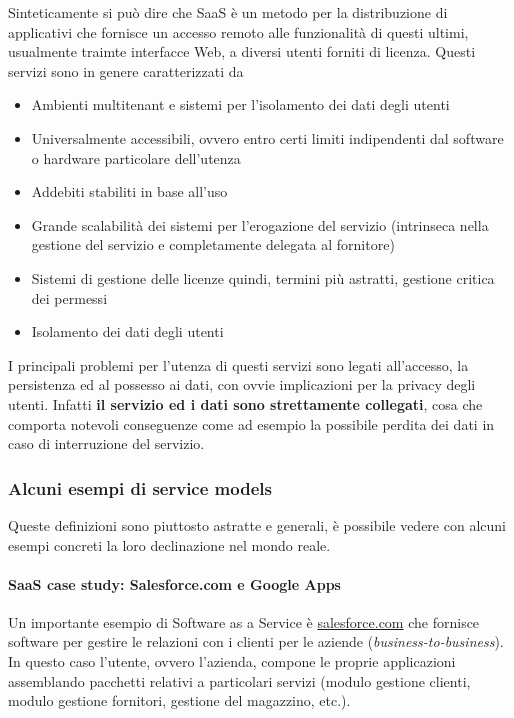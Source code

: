 \documentclass[italian,]{article}
\providecommand{\tightlist}{%
  \setlength{\itemsep}{0pt}\setlength{\parskip}{0pt}}
\let\oldparagraph\paragraph
\renewcommand{\paragraph}[1]{\oldparagraph{#1}\mbox{}}
\begin{document}
Sinteticamente si può dire che SaaS è un metodo per la distribuzione di
applicativi che fornisce un accesso remoto alle funzionalità di questi
ultimi, usualmente traimte interfacce Web, a diversi utenti forniti di
licenza. Questi servizi sono in genere caratterizzati da

\begin{itemize}
\tightlist
\item
  Ambienti multitenant e sistemi per l'isolamento dei dati degli utenti
\item
  Universalmente accessibili, ovvero entro certi limiti indipendenti dal
  software o hardware particolare dell'utenza
\item
  Addebiti stabiliti in base all'uso
\item
  Grande scalabilità dei sistemi per l'erogazione del servizio
  (intrinseca nella gestione del servizio e completamente delegata al
  fornitore)
\item
  Sistemi di gestione delle licenze quindi, termini più astratti,
  gestione critica dei permessi
\item
  Isolamento dei dati degli utenti
\end{itemize}

I principali problemi per l'utenza di questi servizi sono legati
all'accesso, la persistenza ed al possesso ai dati, con ovvie
implicazioni per la privacy degli utenti. Infatti \textbf{il servizio ed
i dati sono strettamente collegati}, cosa che comporta notevoli
conseguenze come ad esempio la possibile perdita dei dati in caso di
interruzione del servizio.

\subsubsection{Alcuni esempi di service
models}\label{alcuni-esempi-di-service-models}

Queste definizioni sono piuttosto astratte e generali, è possibile
vedere con alcuni esempi concreti la loro declinazione nel mondo reale.

\paragraph{SaaS case study: Salesforce.com e Google
Apps}\label{saas-case-study-salesforce.com-e-google-apps}

Un importante esempio di Software as a Service è
\href{www.salesforce.com}{salesforce.com} che fornisce software per
gestire le relazioni con i clienti per le aziende
(\emph{business-to-business}). In questo caso l'utente, ovvero
l'azienda, compone le proprie applicazioni assemblando pacchetti
relativi a particolari servizi (modulo gestione clienti, modulo gestione
fornitori, gestione del magazzino, etc.).
\end{document}
